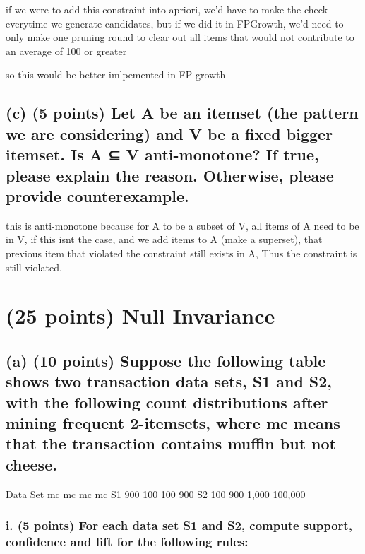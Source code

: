 \documentclass[
]{article}
\begin{document}
if we were to add this constraint into apriori, we'd have to make the
check everytime we generate candidates, but if we did it in FPGrowth,
we'd need to only make one pruning round to clear out all items that
would not contribute to an average of 100 or greater

so this would be better imlpemented in FP-growth

\subsection{(c) (5 points) Let A be an itemset (the pattern we are
considering) and V be a fixed bigger itemset. Is A ⊆ V anti-monotone? If
true, please explain the reason. Otherwise, please provide
counterexample.}\label{c-5-points-let-a-be-an-itemset-the-pattern-we-are-considering-and-v-be-a-fixed-bigger-itemset.-is-a-v-anti-monotone-if-true-please-explain-the-reason.-otherwise-please-provide-counterexample.}

this is anti-monotone because for A to be a subset of V, all items of A
need to be in V, if this isnt the case, and we add items to A (make a
superset), that previous item that violated the constraint still exists
in A, Thus the constraint is still violated.

\section{(25 points) Null Invariance}\label{points-null-invariance}

\subsection{(a) (10 points) Suppose the following table shows two
transaction data sets, S1 and S2, with the following count distributions
after mining frequent 2-itemsets, where mc means that the transaction
contains muffin but not
cheese.}\label{a-10-points-suppose-the-following-table-shows-two-transaction-data-sets-s1-and-s2-with-the-following-count-distributions-after-mining-frequent-2-itemsets-where-mc-means-that-the-transaction-contains-muffin-but-not-cheese.}

Data Set mc mc mc mc S1 900 100 100 900 S2 100 900 1,000 100,000

\subsubsection{i. (5 points) For each data set S1 and S2, compute
support, confidence and lift for the following
rules:}\label{i.-5-points-for-each-data-set-s1-and-s2-compute-support-confidence-and-lift-for-the-following-rules}
\end{document}
